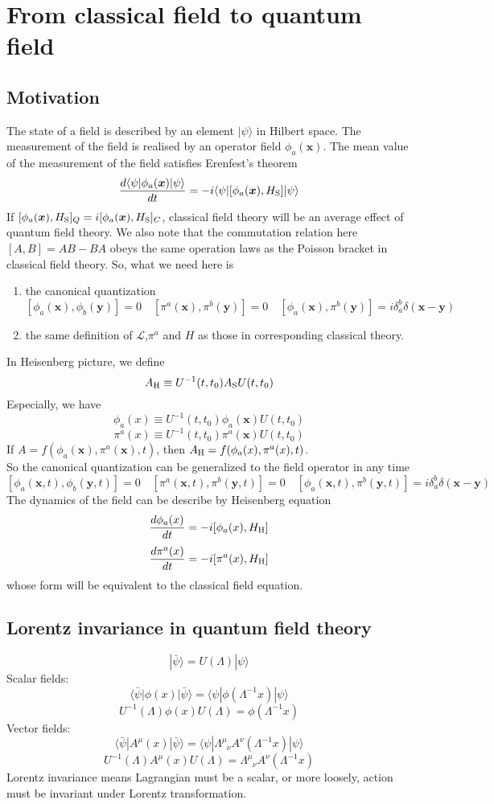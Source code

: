 \chapter{From classical field to quantum field}
\section{Motivation}
\noindent
The state of a field is described by an element $|\psi\rangle$ in Hilbert space. The measurement of the field is realised by an operator field $\phi_a(\bm{x})$. The mean value of the measurement of the field satisfies Erenfest's theorem
\[\frac{d\langle \psi| \phi_a(\bm{x}) | \psi \rangle}{dt} = -i \langle \psi | [\phi_a(\bm{x}),H_{\rm S}] | \psi \rangle\]
If $[\phi_a(\bm{x}),H_{\rm S}]_Q = i[\phi_a(\bm{x}),H_{\rm S}]_C$, classical field theory will be an average effect of quantum field theory. We also note that the commutation relation here $[A,B] = AB - BA$ obeys the same operation laws as the Poisson bracket in classical field theory. So, what we need here is
\begin{enumerate}
\item the canonical quantization
\[[\phi_a(\bm{x}),\phi_b(\bm{y})] = 0 \quad [\pi^a(\bm{x}),\pi^b(\bm{y})] = 0 \quad [\phi_a(\bm{x}),\pi^b(\bm{y})] = i \delta_a^b \delta(\bm{x}-\bm{y}) \]
\item the same definition of $\mathcal{L}$,$\pi^a$ and $H$ as those in corresponding classical theory.
\end{enumerate}
In Heisenberg picture, we define
\[A_{\rm H} \equiv U^{-1}(t,t_0) A_{\rm S} U(t,t_0)\]
Especially, we have
\[\phi_a(x) \equiv U^{-1}(t,t_0) \phi_a(\bm{x}) U(t,t_0)\]
\[\pi^a(x) \equiv U^{-1}(t,t_0) \pi^a(\bm{x}) U(t,t_0)\]
If $A = f(\phi_a(\bm{x}),\pi^a(\bm{x}),t)$, then $A_{\rm H} = f(\phi_a(x),\pi^a(x),t)$. 
\\
So the canonical quantization can be generalized to the field operator in any time
\[[\phi_a(\bm{x},t),\phi_b(\bm{y},t)] = 0 \quad [\pi^a(\bm{x},t),\pi^b(\bm{y},t)] = 0 \quad [\phi_a(\bm{x},t),\pi^b(\bm{y},t)] = i \delta_a^b \delta(\bm{x}-\bm{y}) \]
The dynamics of the field can be describe by Heisenberg equation
\[\frac{d\phi_a(x)}{dt} = -i[\phi_a(x),H_{\rm H}]\]
\[\frac{d\pi^a(x)}{dt} = -i[\pi^a(x),H_{\rm H}]\]
whose form will be equivalent to the classical field equation.

\section{Lorentz invariance in quantum field theory}
\[| \bar{\psi}\rangle = U(\Lambda)| \psi\rangle\]
Scalar fields:
\[\langle \bar{\psi} | \phi(x) | \bar{\psi}\rangle = \langle \psi | \phi(\Lambda^{-1}x) | \psi\rangle\]
\[U^{-1}(\Lambda) \phi(x) U(\Lambda) = \phi(\Lambda^{-1}x)\]
Vector fields:
\[\langle \bar{\psi} | A^{\mu}(x) | \bar{\psi}\rangle = \langle \psi | \Lambda^{\mu}_{\phantom{\mu}\nu} A^{\nu}(\Lambda^{-1}x) | \psi\rangle\]
\[U^{-1}(\Lambda) A^{\mu}(x) U(\Lambda) = \Lambda^{\mu}_{\phantom{\mu}\nu} A^{\nu}(\Lambda^{-1}x)\]
Lorentz invariance means Lagrangian must be a scalar, or more loosely, action must be invariant under Lorentz transformation.


